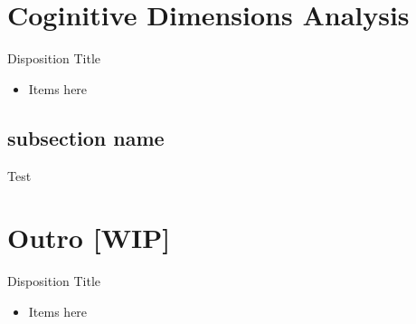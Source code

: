 \section{Coginitive Dimensions Analysis}
\begin{frame}{\secname}{Disposition}
	Title
	\begin{itemize}
		\item Items here
	\end{itemize}
\end{frame}

\subsection{subsection name}
\begin{frame}{\secname}{\subsecname}
	Test
\end{frame}

\section{Outro [WIP]}
\begin{frame}{\secname}{Disposition}
	Title
	\begin{itemize}
		\item Items here
	\end{itemize}
\end{frame}
